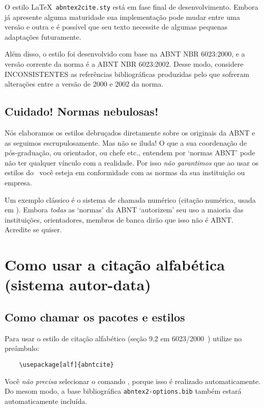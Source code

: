 \documentclass[a4paper]{ltxdoc}
\begin{document}
O estilo \LaTeX\ {\tt abntex2cite.sty} está em fase final de desenvolvimento.
Embora já apresente alguma maturidade sua implementação pode mudar entre uma
versão e outra e é possível que seu texto necessite de algumas pequenas
adaptações futuramente.

Além disso, o estilo foi desenvolvido com base na ABNT NBR 6023:2000, e a versão
corrente da norma é a ABNT NBR 6023:2002. Desse modo, considere INCONSISTENTES
as referências bibliográficas produzidas pelo  que sofreram alterações
entre a versão de 2000 e 2002 da norma.


\subsection{Cuidado! Normas nebulosas!}

Nós elaboramos os estilos debruçados diretamente sobre os originais da ABNT
e as seguimos escrupulosamente. Mas não se iluda! O que a sua coordenação
de pós-graduação, ou orientador, ou chefe etc., entendem por `normas ABNT'
pode não ter qualquer vínculo com a realidade. Por isso \emph{não garantimos}
que ao usar os estilos do \abnTeX\ você esteja em conformidade com as normas
da sua instituição ou empresa.

Um exemplo clássico é o sistema de chamada numérico (citação numérica, usada em
\cite{abntex2cite}). Embora \emph{todas} as `normas' da ABNT
\cite{NBR10520:1988,NBR6023:2000,NBR6023:2002,NBR10520:2001,NBR10520:2002}
`autorizem' seu uso a maioria das instituições, orientadores, membros de banca
dirão que isso não é ABNT. Acredite se quiser.

\section{Como usar a citação alfabética (sistema autor-data)}

\subsection{Como chamar os pacotes e estilos}

\DescribeMacro{\usepackage[alf]{abntcite}}
Para usar o estilo de citação alfabético (seção 9.2 em
6023/2000~\cite{NBR6023:2000}) utilize no preâmbulo:

\begin{verbatim}
    \usepackage[alf]{abntcite}
\end{verbatim}

\DescribeMacro{}
Você \emph{não precisa} selecionar o comando \verb++, porque
isso é realizado automaticamente. Do mesom modo, a base bibliográfica
\verb+abntex2-options.bib+ também estará automaticamente incluída.
\end{document}
